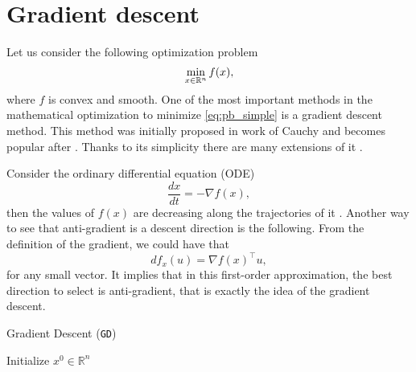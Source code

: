 \section{Gradient descent}\label{sec:basics_gd}
Let us consider the following optimization problem
\begin{equation}\label{eq:pb_simple}
    \min_{x\in\mathbb{R}^n}f(x),
\end{equation}
where $f$ is convex and smooth. One of the most important methods in the mathematical optimization to minimize \eqref{eq:pb_simple} is a gradient descent method. This method was initially proposed in work of Cauchy \cite[Extrait $383$]{cauchy1847methode} and becomes popular after \cite{polyak1963gradient}. Thanks to its simplicity there are many extensions of it \cite{polyak1969minimization, polyak1969conjugate, nesterov2005smooth, beck2009fast}.

Consider the ordinary differential equation (ODE)
$$
\frac{d x}{d t} = -\nabla f(x),
$$
then the values of $f(x)$ are decreasing along the trajectories of it \cite{cauchy1847methode}. Another way to see that anti-gradient is a descent direction is the following. From the definition of the gradient, we could have that
$$
df_x(u) = \nabla f(x)^\top u,
$$
for any small vector. It implies that in this first-order approximation, the best direction to select is anti-gradient, that is exactly the idea of the gradient descent.

\begin{algorithm}
    \caption{Gradient Descent (\texttt{GD})}
    \label{algo:gd}
    \begin{algorithmic}
        \STATE Initialize $x^0\in\mathbb{R}^n$
        \ENDFOR
    \end{algorithmic}
\end{algorithm}

